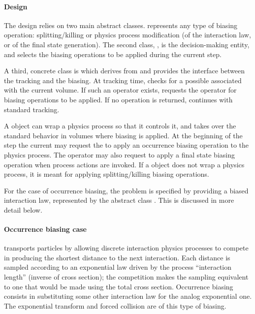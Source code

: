 \paragraph{Design}
The design relies on two main abstract classes.  
represents any type of biasing operation: splitting/killing or physics process 
modification (of the interaction law, or of the final state generation).  The 
second class, , is the decision-making entity, and 
selects the biasing operations to be applied during the current step.

A third, concrete class is 
which derives from  and provides the interface between the
tracking and the biasing.  At tracking time,
 checks for a possible 
 associated with the current volume.  If
such an operator exists,  
requests the operator for biasing operations to be applied.  If no operation is 
returned,  continues
with standard tracking.

A  object can wrap a
physics process so that it controls it, and takes over the standard behavior in 
volumes where biasing is applied.  At the beginning of the step the current 
 may request the 
 to apply an 
occurrence biasing operation to the physics process.  The operator may also
request  to apply a
final state biasing operation when  process 
actions are invoked.  If a 
object does not wrap a physics process, it is meant for applying splitting/killing
biasing operations.

For the case of occurrence biasing, the problem is specified by providing
a biased interaction law, represented by the abstract class 
. This is discussed
in more detail below. 

\paragraph{Occurrence biasing case}
\Gfour{} transports particles by allowing discrete interaction physics processes
to compete in producing the shortest distance to the next interaction.  Each 
distance is sampled according to an exponential law driven by the process 
``interaction length'' (inverse of cross section);  the competition makes the 
sampling equivalent to one that would be made using the total cross section.
Occurrence biasing consists in substituting some other interaction law for the
analog exponential one.  The exponential transform \cite{bib:exptran} and 
forced collision are of this type of biasing.

